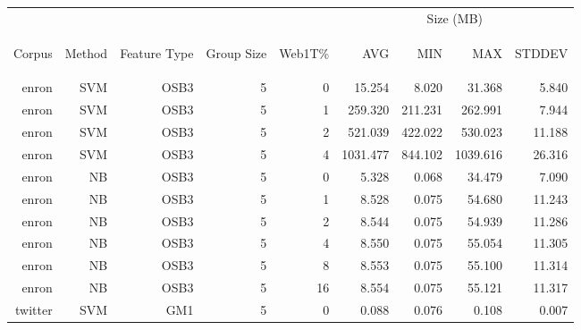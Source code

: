 	\begin{table}[htbp!]
	\begin{center}
		\begin{tabular}{ | r | r | r | r | r | r | r | r | r | }
			\hline
			 &  &  &  &  & \multicolumn{4}{|c|}{Size (MB)}\\ \cline{6-9}
			\begin{sideways}Corpus\end{sideways} & \begin{sideways}Method\end{sideways} & \begin{sideways}Feature Type\end{sideways} & \begin{sideways}Group Size\end{sideways} & \begin{sideways}Web1T\%\end{sideways} & \begin{sideways}AVG\end{sideways} & \begin{sideways}MIN\end{sideways} & \begin{sideways}MAX\end{sideways} & \begin{sideways}STDDEV\end{sideways}\\ \hline
		enron & SVM & OSB3 & 5 & 0 & 15.254 & 8.020 & 31.368 & 5.840\\ \hline 
		enron & SVM & OSB3 & 5 & 1 & 259.320 & 211.231 & 262.991 & 7.944\\ \hline 
		enron & SVM & OSB3 & 5 & 2 & 521.039 & 422.022 & 530.023 & 11.188\\ \hline 
		enron & SVM & OSB3 & 5 & 4 & 1031.477 & 844.102 & 1039.616 & 26.316\\ \hline 
		enron & NB & OSB3 & 5 & 0 & 5.328 & 0.068 & 34.479 & 7.090\\ \hline 
		enron & NB & OSB3 & 5 & 1 & 8.528 & 0.075 & 54.680 & 11.243\\ \hline 
		enron & NB & OSB3 & 5 & 2 & 8.544 & 0.075 & 54.939 & 11.286\\ \hline 
		enron & NB & OSB3 & 5 & 4 & 8.550 & 0.075 & 55.054 & 11.305\\ \hline 
		enron & NB & OSB3 & 5 & 8 & 8.553 & 0.075 & 55.100 & 11.314\\ \hline 
		enron & NB & OSB3 & 5 & 16 & 8.554 & 0.075 & 55.121 & 11.317\\ \hline 
		twitter & SVM & GM1 & 5 & 0 & 0.088 & 0.076 & 0.108 & 0.007\\ \hline 

\end{tabular}
\end{center}
\end{table}
